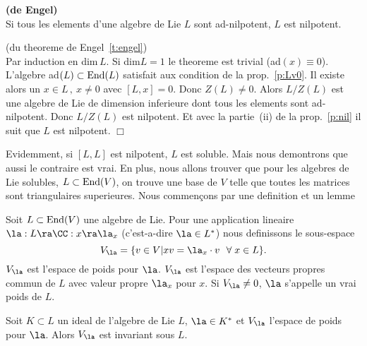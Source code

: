 \begin{ttt}{\bf (de Engel)}\label{t:engel}\\
Si tous les elements d'une algebre de Lie $L$ sont ad-nilpotent, $L$ est nilpotent. 
\end{ttt}

\begin{prv}(du theoreme de Engel~\ref{t:engel})\\
Par induction en dim$\,L$. Si dim$L=1$ le theoreme est trivial (ad$(x) \equiv 0$). 
L'algebre ad$(L)\subset {\rm End}(L)$ satisfait aux condition de la prop.~\ref{p:Lv0}. Il existe alors un 
$x\in L\,,~ x\neq 0$ avec $[L,x]=0$. Donc $Z(L)\neq 0$. Alors $L/Z(L)$ est une algebre de Lie de 
dimension inferieure dont tous les elements sont ad-nilpotent. Donc $L/Z(L)$ est nilpotent. Et avec
la partie~(ii) de la prop.~\ref{p:nil} il suit que $L$ est nilpotent. \hfill $\Box$
\end{prv}

Evidemment, si $[L,L]$ est nilpotent, $L$ est soluble. Mais nous demontrons que
aussi le contraire est vrai. En plus, nous allons trouver que pour les algebres de Lie solubles, 
$L \subset {\rm End}(V)$, on trouve une base de $V$ telle que toutes les matrices sont  
triangulaires superieures. Nous commen\c{c}ons par une definition et un lemme

\begin{ddd}\label{d1:poid}
Soit $L\subset {\rm End}(V)$ une algebre de Lie. Pour une application lineaire 
$\la :L \ra \CC : x \ra \la_x$ (c'est-a-dire $\la \in L^*$) nous definissons  
 le sous-espace
$$ V_\la = \{v\in V| xv =\la_x\cdot v ~~ \forall \; x\in L \} .$$
$V_\la$ est l'espace de poids pour $\la$. 
$V_\la$ est l'espace des vecteurs propres commun de $L$ avec valeur propre $\la_x$ pour $x$.
Si $V_\la \neq 0$,  $\la$ s'appelle un vrai poids de $L$. 
\end{ddd}

\begin{lem}\label{l:clos}
Soit $K\subset L$ un ideal de l'algebre de Lie $L$, $\la \in K^*$ et $V_\la$ l'espace 
de poids pour  $\la$. Alors $V_\la$ est invariant sous $L$.
\end{lem}

